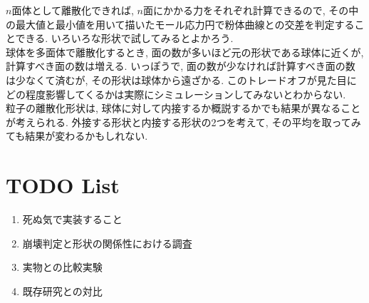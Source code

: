 \documentclass[a4paper, 10pt]{jarticle} %
\begin{document}
$n$面体として離散化できれば, $n$面にかかる力をそれぞれ計算できるので, その中の最大値と最小値を用いて描いたモール応力円で粉体曲線との交差を判定することできる.
いろいろな形状で試してみるとよかろう.\\
球体を多面体で離散化するとき, 面の数が多いほど元の形状である球体に近くが, 計算すべき面の数は増える.
いっぽうで, 面の数が少なければ計算すべき面の数は少なくて済むが, その形状は球体から遠ざかる.
このトレードオフが見た目にどの程度影響してくるかは実際にシミュレーションしてみないとわからない.\\
粒子の離散化形状は, 球体に対して内接するか概説するかでも結果が異なることが考えられる.
外接する形状と内接する形状の2つを考えて, その平均を取ってみても結果が変わるかもしれない.


\section{TODO List}
\begin{enumerate}
 \item 死ぬ気で実装すること
 \item 崩壊判定と形状の関係性における調査
 \item 実物との比較実験
 \item 既存研究との対比
\end{enumerate}





\end{document}
